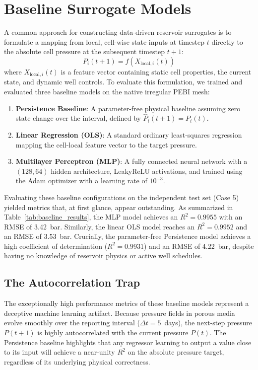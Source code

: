 \section{Baseline Surrogate Models}
A common approach for constructing data-driven reservoir surrogates is to formulate a mapping from local, cell-wise state inputs at timestep $t$ directly to the absolute cell pressure at the subsequent timestep $t+1$:
\begin{equation}
\label{eq:direct_p}
P_i(t+1) = f(X_{\text{local}, i}(t))
\end{equation}
where $X_{\text{local}, i}(t)$ is a feature vector containing static cell properties, the current state, and dynamic well controls. To evaluate this formulation, we trained and evaluated three baseline models on the native irregular PEBI mesh:
\begin{enumerate}
    \item \textbf{Persistence Baseline}: A parameter-free physical baseline assuming zero state change over the interval, defined by $\hat{P}_i(t+1) = P_i(t)$.
    \item \textbf{Linear Regression (OLS)}: A standard ordinary least-squares regression mapping the cell-local feature vector to the target pressure.
    \item \textbf{Multilayer Perceptron (MLP)}: A fully connected neural network with a $(128, 64)$ hidden architecture, LeakyReLU activations, and trained using the Adam optimizer with a learning rate of $10^{-3}$.
\end{enumerate}

Evaluating these baseline configurations on the independent test set (Case 5) yielded metrics that, at first glance, appear outstanding. As summarized in Table~\ref{tab:baseline_results}, the MLP model achieves an $R^2 = 0.9955$ with an RMSE of 3.42~bar. Similarly, the linear OLS model reaches an $R^2 = 0.9952$ and an RMSE of 3.53~bar. Crucially, the parameter-free Persistence model achieves a high coefficient of determination ($R^2 = 0.9931$) and an RMSE of 4.22~bar, despite having no knowledge of reservoir physics or active well schedules.

\subsection{The Autocorrelation Trap}
The exceptionally high performance metrics of these baseline models represent a deceptive machine learning artifact. Because pressure fields in porous media evolve smoothly over the reporting interval ($\Delta t = 5$~days), the next-step pressure $P(t+1)$ is highly autocorrelated with the current pressure $P(t)$. The Persistence baseline highlights that any regressor learning to output a value close to its input will achieve a near-unity $R^2$ on the absolute pressure target, regardless of its underlying physical correctness. 

